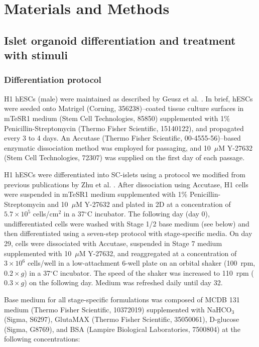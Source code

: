 \section{Materials and Methods}

\subsection{Islet organoid differentiation and treatment with stimuli}

\subsubsection{Differentiation protocol}

H1 hESCs (male) were maintained as described by Geusz et al. \cite{Geusz2021-mr}. In brief, hESCs were seeded onto Matrigel (Corning, 356238)–coated tissue culture surfaces in mTeSR1 medium (Stem Cell Technologies, 85850) supplemented with 1\% Penicillin-Streptomycin (Thermo Fisher Scientific, 15140122), and propagated every 3 to 4 days. An Accutase (Thermo Fisher Scientific, 00-4555-56)–based enzymatic dissociation method was employed for passaging, and 10~$\mu$M Y-27632 (Stem Cell Technologies, 72307) was supplied on the first day of each passage.

H1 hESCs were differentiated into SC-islets using a protocol we modified from previous publications by Zhu et al. \cite{Zhu2023-qm}. After dissociation using Accutase, H1 cells were suspended in mTeSR1 medium supplemented with 1\% Penicillin-Streptomycin and 10~$\mu$M Y-27632 and plated in 2D at a concentration of $5.7 \times 10^5$ cells/cm$^2$ in a 37$^{\circ}$C incubator. The following day (day 0), undifferentiated cells were washed with Stage 1/2 base medium (see below) and then differentiated using a seven-step protocol with stage-specific media. On day 29, cells were dissociated with Accutase, suspended in Stage 7 medium supplemented with 10~$\mu$M Y-27632, and reaggregated at a concentration of $3 \times 10^6$ cells/well in a low-attachment 6-well plate on an orbital shaker (100~rpm, $0.2 \times g$) in a 37$^{\circ}$C incubator. The speed of the shaker was increased to 110~rpm ($0.3 \times g$) on the following day. Medium was refreshed daily until day 32.

Base medium for all stage-specific formulations was composed of MCDB 131 medium (Thermo Fisher Scientific, 10372019) supplemented with NaHCO$_3$ (Sigma, S6297), GlutaMAX (Thermo Fisher Scientific, 35050061), D-glucose (Sigma, G8769), and BSA (Lampire Biological Laboratories, 7500804) at the following concentrations:

